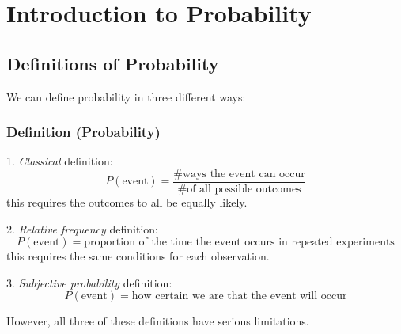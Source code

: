 \chapter{Introduction to Probability}
\section{Definitions of Probability}

We can define probability in three different ways:

\begin{defbox}
    \subsection{Definition (Probability)}
    1. \emph{Classical} definition:
    \[ P(\text{event})=\frac{\text{\# ways the event can occur}}
        {\text{\# of all possible outcomes}} \]
    this requires the outcomes to all be equally likely.

    2. \emph{Relative frequency} definition:
    \[ P(\text{event})=\text{proportion of the time the event occurs in repeated experiments} \]
    this requires the same conditions for each observation.

    3. \emph{Subjective probability} definition:
    \[ P(\text{event})=\text{how certain we are that the event will occur} \]
\end{defbox}
However, all three of these definitions have serious limitations.
